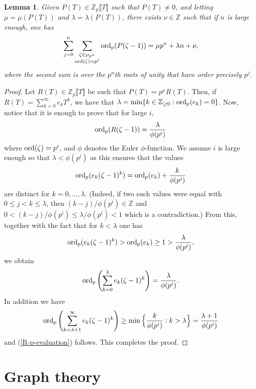 \documentclass[11pt]{amsart}
\newtheorem{lemma}[theorem]{Lemma}
\numberwithin{equation}{section}
\theoremstyle{remark}
\theoremstyle{definition}
\begin{document}
\begin{lemma} \label{useful_p_s}
Given $P(T) \in \mathbb{Z}_{p}\llbracket T \rrbracket$ such that $P(T) \neq 0$, and letting $\mu = \mu(P(T))$ and $\lambda = \lambda(P(T))$, there exists $\nu \in \mathbb{Z}$ such that if $n$ is large enough, one has
$$\sum_{j=0}^{n}\sum_{\substack{\zeta \in \mu_{p^{n}} \\ {\rm ord}(\zeta) = p^{j}}}{\rm ord}_{p}(P(\zeta - 1)) = \mu p^{n} + \lambda n + \nu, $$
where the second sum is over the $p^{n}$th roots of unity that have order precisely $p^{j}$.
\end{lemma}
\begin{proof}
Let $R(T)\in \mathbb{Z}_{p}\llbracket T \rrbracket$ be such that $P(T)=p^{\mu} R(T)$. Then, if $R(T)=\sum_{k=0}^{\infty} e_k T^k$, we have that $\lambda={\rm min} \{k \in \mathbb{Z}_{\geq 0} : {\rm ord}_{p}(e_k)=0\}$. Now, notice that it is enough to prove that for large $i$, 
\begin{equation} \label{R-p-evaluation}
{\rm ord}_{p} (R(\zeta-1))=\frac{\lambda}{\phi(p^i)}
\end{equation}
where ${\rm ord}(\zeta)=p^i$, and $\phi$ denotes the Euler $\phi$-function. We assume $i$ is large enough so that $\lambda < \phi(p^i)$ as this ensures that the values 
$${\rm ord}_{p}(e_k(\zeta-1)^k)= {\rm ord}_{p}(e_k)+\frac{k}{\phi(p^i)}$$
are distinct for $k=0,  ... , \lambda$. (Indeed, if two such values were equal with $0\leq j< k\leq \lambda$, then $(k-j)/\phi(p^i) \in \mathbb{Z}$ and $0<(k-j)/\phi(p^i)\leq \lambda/\phi(p^{i}) < 1$ which is a contradiction.) From this, together with the fact that for $k<\lambda$ one has 
$${\rm ord}_{p}(e_k(\zeta-1)^k) > {\rm ord}_{p}(e_k) \geq 1 > \frac{\lambda}{\phi(p^i)},$$
we obtain  
$${\rm ord}_{p} \left(\sum_{k=0}^{\lambda} e_k(\zeta-1)^k\right)=\frac{\lambda}{\phi(p^i)}.$$
In addition we have
$${\rm ord}_{p}\left(\sum_{k=\lambda+1}^{\infty} e_k(\zeta-1)^k\right) \geq    \min \Big\{\frac{k}{\phi(p^i)}: k> \lambda\Big\}=\frac{\lambda+1}{\phi(p^i)}$$ and (\ref{R-p-evaluation}) follows. This completes the proof.
\end{proof}




\section{Graph theory} \label{section:gra}
\end{document}
